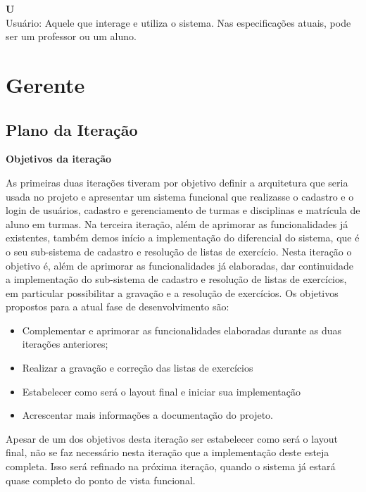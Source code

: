 \documentclass[12pt,letterpaper]{article}
\begin{document}
  {\bf U}\\
    Usuário: Aquele que interage e utiliza o sistema. Nas especificações
    atuais, pode ser um professor ou um aluno.

\pagebreak



\section{Gerente}

\subsection{Plano da Iteração}

\vspace{1cm}
{\large {\bf Objetivos da iteração}}
\vspace{0.5cm}

As primeiras duas iterações tiveram por objetivo definir a arquitetura que seria usada no projeto 
e apresentar um sistema funcional que realizasse o cadastro e o login de usuários, 
cadastro e gerenciamento de turmas e disciplinas e matrícula de aluno em turmas.
Na terceira iteração, além de aprimorar as funcionalidades já existentes, também demos início
a implementação do diferencial do sistema, que é o seu sub-sistema de cadastro e resolução
de listas de exercício.
Nesta iteração o objetivo é, além de aprimorar as funcionalidades já elaboradas, dar continuidade
a implementação do sub-sistema de cadastro e resolução de listas de exercícios, em particular
possibilitar a gravação e a resolução de exercícios.
Os objetivos propostos para a atual fase de desenvolvimento são:

\begin{itemize}
\item{} Complementar e aprimorar as funcionalidades elaboradas durante as duas iterações anteriores;
\item{} Realizar a gravação e correção das listas de exercícios
\item{} Estabelecer como será o layout final e iniciar sua implementação
\item{} Acrescentar mais informações a documentação do projeto.
\end{itemize}

Apesar de um dos objetivos desta iteração ser estabelecer como será o layout final, não se faz 
necessário nesta iteração que a implementação deste esteja completa. Isso será refinado na
próxima iteração, quando o sistema já estará quase completo do ponto de vista funcional.
\end{document}

